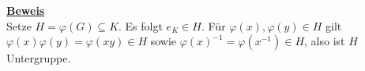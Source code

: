 \documentclass[a4paper, pagesize=pdftex, pdftex, twoside, headsepline, index=totoc,toc=listof, fontsize=10pt, cleardoublepage=empty, headinclude, DIV=13, BCOR=13mm]{scrartcl}
\newcommand{\bet}[1]{\uline{\textbf{#1}}} %
\begin{document}
\bet{Beweis}\\
Setze $H=\varphi(G)\subseteq K$. Es folgt $e_K \in H$. Für $\varphi(x),\varphi(y)\in H$ gilt $\varphi(x)\varphi(y)=\varphi(xy)\in H$ sowie $\varphi(x)^{-1}=\varphi(x^{-1}) \in H$, also ist $H$ Untergruppe.

















\cleardoubleoddemptypage
{}
\setcounter{page}{1}
\printindex
\listoffigures
\end{document}
